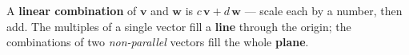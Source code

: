 \documentclass[10pt]{article}
\begin{document}
\vspace{0.10in}

\begin{remindbox}
\small A \textbf{linear combination} of $\mathbf{v}$ and $\mathbf{w}$ is
$c\,\mathbf{v}+d\,\mathbf{w}$ --- scale each by a number, then add. The multiples of a single
vector fill a \textbf{line} through the origin; the combinations of two \emph{non-parallel}
vectors fill the whole \textbf{plane}.
\end{remindbox}
\end{document}
